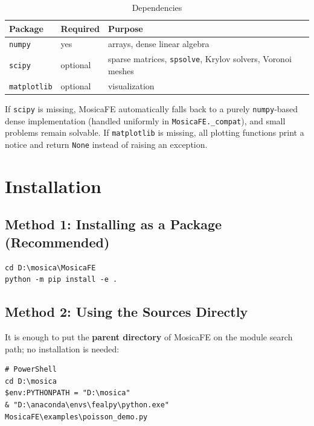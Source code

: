 \documentclass[11pt,oneside]{book}
\theoremstyle{definition}
\theoremstyle{plain}
\newcommand{\mosica}{\textsf{MosicaFE}}
\newcommand{\code}[1]{\texttt{#1}}
\newcommand{\module}[1]{\texttt{MosicaFE.#1}}
\begin{document}
\begin{table}[htbp]
\centering
\caption{Dependencies}
\label{tab:deps}
\begin{lrbox}{\guideTableBox}
\begin{tabular}{@{}lll@{}}
\toprule
Package & Required & Purpose \\
\midrule
\code{numpy} & yes & arrays, dense linear algebra \\
\code{scipy} & optional & sparse matrices, \code{spsolve}, Krylov solvers, Voronoi meshes \\
\code{matplotlib} & optional & visualization \\
\bottomrule
\end{tabular}
\end{lrbox}%
\ifdim\wd\guideTableBox>\linewidth
  \resizebox{\linewidth}{!}{\usebox{\guideTableBox}}%
\else\usebox{\guideTableBox}\fi
\end{table}

If \code{scipy} is missing, \mosica{} automatically falls back to a purely
\code{numpy}-based dense implementation (handled uniformly in \module{\_compat}),
and small problems remain solvable. If \code{matplotlib} is missing, all plotting
functions print a notice and return \code{None} instead of raising an exception.

\section{Installation}

\subsection{Method 1: Installing as a Package (Recommended)}

\begin{lstlisting}[style=shell]
cd D:\mosica\MosicaFE
python -m pip install -e .
\end{lstlisting}

\subsection{Method 2: Using the Sources Directly}

It is enough to put the \textbf{parent directory} of \mosica{} on the module search
path; no installation is needed:

\begin{lstlisting}[style=shell]
# PowerShell
cd D:\mosica
$env:PYTHONPATH = "D:\mosica"
& "D:\anaconda\envs\fealpy\python.exe" MosicaFE\examples\poisson_demo.py
\end{lstlisting}
\end{document}
